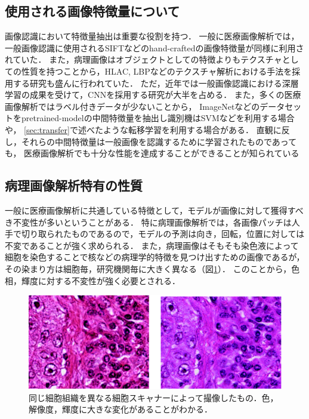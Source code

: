 \subsection{使用される画像特徴量について}
画像認識において特徴量抽出は重要な役割を持つ．
一般に医療画像解析では，一般画像認識に使用されるSIFTなどのhand-craftedの画像特徴量が同様に利用されていた\cite{caicedo2009histopathology}．
また，病理画像はオブジェクトとしての特徴よりもテクスチャとしての性質を持つことから，HLAC, LBPなどのテクスチャ解析における手法を採用する研究も盛んに行われていた\cite{sertel2008texture, sertel2009histopathological, nosato2011extended}．
ただ，近年では一般画像認識における深層学習の成果を受けて，CNNを採用する研究が大半を占める．
また，多くの医療画像解析ではラベル付きデータが少ないことから，
ImageNetなどのデータセットをpretrained-modelの中間特徴量を抽出し識別機はSVMなどを利用する場合や，
\ref{sec:transfer}で述べたような転移学習を利用する場合がある．
直観に反し，それらの中間特徴量は一般画像を認識するために学習されたものであっても，
医療画像解析でも十分な性能を達成することができることが知られている\cite{li2014medical, tajbakhsh2016convolutional}

\subsection{病理画像解析特有の性質}
一般に医療画像解析に共通している特徴として，モデルが画像に対して獲得すべき不変性が多いということがある．
特に病理画像解析では，各画像パッチは人手で切り取られたものであるので，モデルの予測は向き，回転，位置に対しては不変であることが強く求められる．
また，病理画像はそもそも染色液によって細胞を染色することで核などの病理学的特徴を見つけ出すための画像であるが，
その染まり方は細胞毎，研究機関毎に大きく異なる（図\ref{fig:comparison_color}）．
このことから，色相，輝度に対する不変性が強く必要とされる．

\begin{figure}[tbp]
     \begin{center}
      \includegraphics[width=13cm]{figures/comparison_color.pdf}
     \end{center}
    \caption{\label{fig:comparison_color}同じ細胞組織を異なる細胞スキャナーによって撮像したもの．色，解像度，輝度に大きな変化があることがわかる．}
\end{figure}

